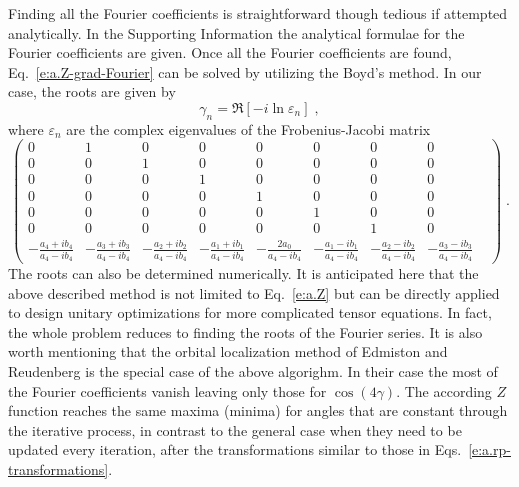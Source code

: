 \documentclass[aip,graphicx]{revtex4-1}
\begin{document}
Finding all the Fourier coefficients is straightforward though tedious if attempted analytically. 
In the Supporting Information the analytical formulae for the Fourier coefficients are given. 
Once all the Fourier coefficients are found, Eq.~\eqref{e:a.Z-grad-Fourier} can be solved
by utilizing the Boyd's method.\cite{Boyd.JEngMath.2006} 
In our case, the roots are given by
%
\begin{equation}
 \gamma_n = \Re\left[-i\ln{\varepsilon_n}\right] \;,
\end{equation}
%
where $\varepsilon_n$ are the complex eigenvalues of the Frobenius\hyp{}Jacobi matrix
%
\begin{equation}
\begin{pmatrix}
0 & 1 & 0 & 0 & 0 & 0 & 0 & 0\\
0 & 0 & 1 & 0 & 0 & 0 & 0 & 0\\
0 & 0 & 0 & 1 & 0 & 0 & 0 & 0\\
0 & 0 & 0 & 0 & 1 & 0 & 0 & 0\\
0 & 0 & 0 & 0 & 0 & 1 & 0 & 0\\
0 & 0 & 0 & 0 & 0 & 0 & 1 & 0\\
-\frac{a_4+ib_4}{a_4-ib_4} &
-\frac{a_3+ib_3}{a_4-ib_4} &
-\frac{a_2+ib_2}{a_4-ib_4} &
-\frac{a_1+ib_1}{a_4-ib_4} & 
-\frac{2a_0}{a_4-ib_4} &
-\frac{a_1-ib_1}{a_4-ib_4} &
-\frac{a_2-ib_2}{a_4-ib_4} &
-\frac{a_3-ib_3}{a_4-ib_4} &
\end{pmatrix}  \;.
\end{equation}
%
The roots can also be determined numerically. 
It is anticipated here that the above described method is not limited to Eq.~\eqref{e:a.Z} but can be directly applied 
to design unitary optimizations for more complicated tensor equations. In fact, the whole problem
reduces to finding the roots of the Fourier series.
It is also worth mentioning that the orbital localization method of Edmiston and Reudenberg
is the special case of the above algorighm. In their case the most of the Fourier coefficients
vanish leaving only those for $\cos(4\gamma)$. The according $Z$ function reaches 
the same maxima (minima) for angles that are constant through the iterative process,
in contrast to the general case when they need to be updated every iteration,
after the transformations similar to those in Eqs.~\eqref{e:a.rp-transformations}.


\end{document}
